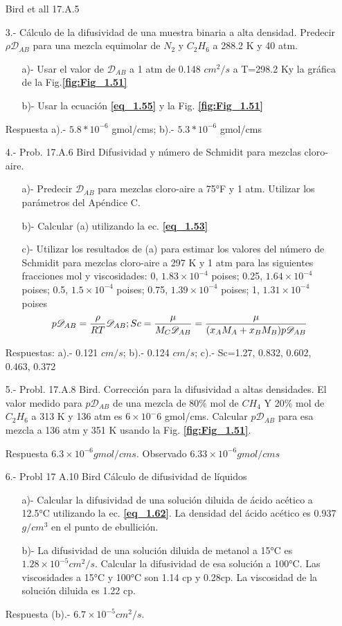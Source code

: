 \begin{itemize}
Bird et all 17.A.5    
\item[3.-] Cálculo de la difusividad de una muestra binaria a alta densidad. 
Predecir $\rho \mathscr{D}_{AB}$ para una mezcla equimolar de $N_{2}$ y $C_{2}H_{6}$ a 288.2 K y 40 atm.
    \begin{itemize}
     \item [a)-] Usar el valor de $\mathscr{D}_{AB}$ a 1 atm de  0.148 $cm^2/s$ a T=298.2 Ky la gráfica de la Fig.\textbf{\eqref{fig:Fig_1.51}}
     \item [b)-] Usar la ecuación \textbf{\eqref{eq_1.55}} y la Fig. \textbf{\eqref{fig:Fig_1.51}}
    \end{itemize}    
Respuesta a).- $5.8*10^{-6}$ gmol/cms; b).- $5.3*10^{-6}$ gmol/cms
\item[4.-] Prob. 17.A.6 Bird
Difusividad y número de Schmidit para mezclas cloro-aire. 
    \begin{itemize}
    \item [a)-] Predecir $\mathscr{D}_{AB}$ para mezclas cloro-aire a 75°F y 1 atm.
    Utilizar los parámetros del Apéndice C.
    \item [b)-] Calcular (a) utilizando la ec. \textbf{\eqref{eq_1.53}}
    \item [c)-]Utilizar los resultados de (a) para estimar los valores del número de Schmidit para mezclas cloro-aire a 297 K y 1 atm para las siguientes fracciones mol y viscosidades:
    0, $1.83\times 10^{-4} $ poises; 0.25, $1.64 \times10^{-4} $ poises; 0.5, $1.5\times10^{-4} $ poises; 0.75, $1.39\times10^{-4} $ poises; 1, $1.31\times10^{-4} $ poises
    $$ p\mathscr{D}_{AB}= \frac{\rho}{RT}\mathscr{D}_{AB};\space  Sc=\frac{\mu}{M_{C}\mathscr{D}_{AB}}=\frac{\mu}{(x_{A}M_{A}+x_{B}M_{B})p\mathscr{D}_{AB}}$$
\end{itemize}
Respuestas: a).- 0.121 $cm/s$; b).- 0.124 $cm/s$; c).- Sc=1.27, 0.832, 0.602, 0.463, 0.372
\item[5.-] Probl. 17.A.8 Bird.
Corrección para la difusividad a altas densidades. 
El valor medido para $p\mathscr{D}_{AB}$ de una mezcla de 80\% mol de $CH_{4}$ Y 20\% mol de $C_{2}H_{6}$ a 313 K y 136 atm es $6\times10^-6$ gmol/cms.
Calcular $p\mathscr{D}_{AB}$ para esa mezcla a 136 atm y 351 K usando la Fig. \textbf{\eqref{fig:Fig_1.51}}.

Respuesta $6.3\times 10^{-6} gmol/cm s$. Observado $6.33 \times 10^{-6 }gmol/cm s$
\item[6.-]   Probl 17 A.10 Bird 
Cálculo de difusividad de líquidos 
\begin{itemize}
     \item [a)-] Calcular la difusividad de una solución diluida de ácido acético a 12.5°C utilizando la ec. \textbf{\eqref{eq_1.62}}. La densidad del ácido acético es 0.937 $g/cm^3$ en el punto de ebullición.
     \item [b)-] La difusividad de una solución diluida de metanol a 15°C es $1.28\times 10^{-5} cm^2/s$. Calcular la difusividad de esa solución a 100°C. 
     Las viscosidades a 15°C y 100°C son 1.14 cp y 0.28cp.
     La viscosidad de la solución diluida es 1.22 cp.
    \end{itemize}
Respuesta (b).- $6.7\times10^{-5} cm^2/s$.
\end{itemize}
\newpage


 